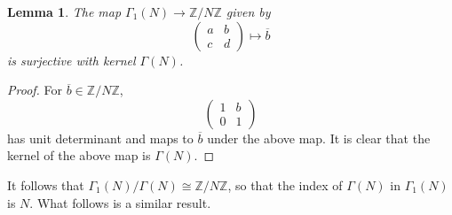 \documentclass[10pt,leqno,twoside]{article}
\theoremstyle{plain}
\newtheorem{lemma}[lem]{Lemma}
\theoremstyle{definition}
\numberwithin{equation}{section}
\numberwithin{lem}{section}
\newcommand{\smod}[1]{\;(\bmod\; #1)}
\newcommand{\abcd}{\begin{pmatrix}
    a & b \\ c & d
\end{pmatrix}}
\begin{document}
\begin{lemma}
    The map $\varGamma_1(N)\to \mathbb{Z}/N\mathbb{Z}$ given by \[\abcd\mapsto \overline b\] is surjective with kernel $\varGamma(N)$. 
\end{lemma}
\begin{proof}
    For $\overline b\in\mathbb{Z}/N\mathbb{Z}$, \[\begin{pmatrix}
        1 & b \\ 0 & 1
    \end{pmatrix}\] has unit determinant and maps to $\overline b$ under the above map. It is clear that the kernel of the above map is $\varGamma(N)$.
\end{proof} 
It follows that $\varGamma_1(N)/\varGamma(N)\cong \mathbb{Z}/N\mathbb{Z}$, so that the index of $\varGamma(N)$ in $\varGamma_1(N)$ is $N$. What follows is a similar result.
\end{document}

